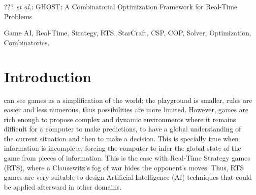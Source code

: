 \documentclass[journal]{IEEEtran}
\newcommand{\ghost}{\textsc{GHOST}\xspace}
\begin{document}
%
{??? \MakeLowercase{\textit{et al.}}: \ghost: A Combinatorial Optimization Framework for Real-Time Problems}

\maketitle

\begin{abstract}
  This paper presents \ghost, a combinatorial optimization framework
  that a Real-Time Strategy (RTS) AI developer can use to model and
  solve any problem encoded as a constraint satisfaction/optimization
  problem.  We show a way to model three different problems as a constraint
  satisfaction/optimization problem, using instances from the RTS game StarCraft as test beds.
  Each problem belongs to a specific level of abstraction (the target
  selection as \emph{reactive control} problem, the wall-in as a
  \emph{tactics} problem and the build order planning as a
  \emph{strategy} problem). In our experiments, \ghost shows very good
  results computed within some tens of milliseconds. We also show
  \ghost outperforms by far state-of-the-art constraint solvers,
  matching them on the resources allocation problem, a very common combinatorial optimization problem.
\end{abstract}

\begin{IEEEkeywords}
Game AI, Real-Time, Strategy, RTS, StarCraft, CSP, COP, Solver,
Optimization, Combinatorics.
\end{IEEEkeywords}

%
\IEEEpeerreviewmaketitle

\section{Introduction}\label{sec:intro}

 can see games  as a simplification of the world:
the playground  is smaller, rules  are easier and less  numerous, thus
possibilities  are more  limited. However,  games are  rich enough  to
propose complex and dynamic environments where it remains difficult for a
computer  to make  predictions,  to have a  global  understanding of  the
current situation  and then to make  a decision. This is  specially true
when  information is  incomplete, forcing  the computer  to infer  the
global state of the game from  pieces of information. This is the case
with Real-Time Strategy  games (RTS), where a Clausewitz's  fog of war
hides  the opponent's  moves.  Thus,  RTS games  are very  suitable to
design  Artificial  Intelligence (AI) techniques  that  could  be  applied
afterward in other domains.
\end{document}
